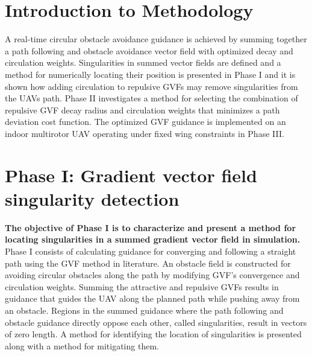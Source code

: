 \documentclass[numbered,pdftex]{ohio-etd}
\begin{document}
%



\section{Introduction to Methodology}
A real-time circular obstacle avoidance guidance is achieved by summing together a path following and obstacle avoidance vector field with optimized decay and circulation weights. Singularities in summed vector fields are defined and a method for numerically locating their position is presented in Phase I and it is shown how adding circulation to repulsive GVFs may remove singularities from the UAVs path. Phase II investigates a method for selecting the combination of repulsive GVF decay radius and circulation weights that minimizes a path deviation cost function. The optimized GVF guidance is implemented on an indoor multirotor UAV operating under fixed wing constraints in Phase III.


\section{Phase I: Gradient vector field singularity detection}
 \textbf{The objective of Phase I is to characterize and present a method for locating singularities in a summed gradient vector field in simulation.} Phase I consists of calculating guidance for converging and following a straight path using the GVF method in literature. An obstacle field is constructed for avoiding circular obstacles along the path by modifying GVF's convergence and circulation weights. Summing the attractive and repulsive GVFs results in guidance that guides the UAV along the planned path while pushing away from an obstacle. Regions in the summed guidance where the path following and obstacle guidance directly oppose each other, called singularities, result in vectors of zero length. A method for identifying the location of singularities is presented along with a method for mitigating them. 
 
\end{document}
